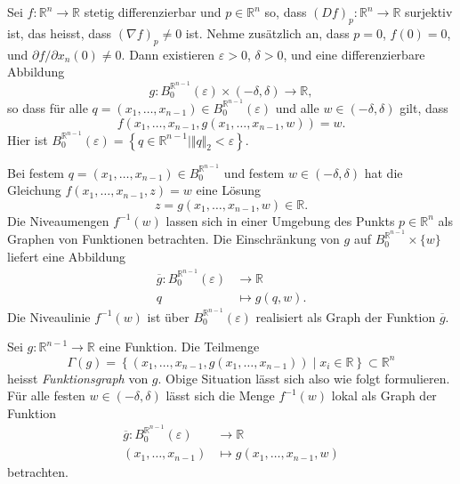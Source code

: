 \documentclass[../main.tex]{subfiles}
\begin{document}
\begin{theorem}%
  \label{thm:implicit-special}
  Sei $f \colon \mathbb{R}^n \to \mathbb{R}$ 
  stetig differenzierbar und $p \in \mathbb{R}^n$ 
  so, dass ${(Df)}_p \colon \mathbb{R}^n \to \mathbb{R}$ surjektiv ist,
  das heisst, dass ${(\nabla f)}_p \neq 0$ ist.
  Nehme zusätzlich an, dass $p = 0$, $f(0) = 0$,
  und $\partial f/ \partial x_n (0) \neq 0$.
  Dann existieren $\varepsilon > 0$, $\delta > 0$,
  und eine differenzierbare Abbildung
  \[
  g \colon B_0^{\mathbb{R}^{n-1}}(\varepsilon) \times (-\delta, \delta)
  \to \mathbb{R},
  \]
  so dass für alle 
  $q = (x_1, \dots, x_{n-1}) \in B_0^{\mathbb{R}^{n-1}}(\varepsilon)$ 
  und alle $w \in (-\delta, \delta)$ gilt, dass
  \[
  f(x_1, \dots, x_{n-1}, g(x_1, \dots, x_{n-1}, w)) = w.
  \]
  Hier ist $B_0^{\mathbb{R}^{n-1}}(\varepsilon)
  = \left\{q \in\mathbb{R}^{n-1} \mid \Vert q \Vert_2 < \varepsilon \right\}$.
\end{theorem}

\begin{geometric}
  Bei festem $q = (x_1, \dots, x_{n-1}) \in B_0^{\mathbb{R}^{n-1}}$ 
  und festem $w \in (-\delta, \delta)$ hat die Gleichung
  $f(x_1, \dots, x_{n-1}, z) = w$ eine Lösung
  \[
  z = g(x_1, \dots, x_{n-1}, w) \in \mathbb{R}.
  \]
  Die Niveaumengen $f^{-1}(w)$ lassen sich in einer
  Umgebung des Punkts $p \in \mathbb{R}^n$ 
  als Graphen von Funktionen betrachten.
  Die Einschränkung von $g$ auf $B_0^{\mathbb{R}^{n-1}} \times \{w\}$
  liefert eine Abbildung
  \begin{align*}
    \overline g \colon B_0^{\mathbb{R}^{n-1}}(\varepsilon) & \to \mathbb{R} \\
    q & \mapsto g(q, w).
  \end{align*}
  Die Niveaulinie $f^{-1}(w)$ ist über
  $B_0^{\mathbb{R}^{n-1}}(\varepsilon)$ realisiert als Graph der
  Funktion $\overline g$.
\end{geometric}

\begin{remark}
  Sei $g \colon \mathbb{R}^{n-1} \to \mathbb{R}$ eine Funktion.
  Die Teilmenge
  \[
    \Gamma(g) = \left\{(x_1, \dots, x_{n-1}, g(x_1, \dots, x_{n-1})) \mid 
    x_i \in \mathbb{R} \right\} \subset \mathbb{R}^n
  \]
  heisst \emph{Funktionsgraph} von $g$.
  Obige Situation lässt sich also wie folgt formulieren.
  Für alle festen $w \in (-\delta, \delta)$ lässt sich die
  Menge $f^{-1}(w)$ lokal als Graph der Funktion
  \begin{align*}
    \overline g \colon B_0^{\mathbb{R}^{n-1}}(\varepsilon) & \to \mathbb{R} \\
    (x_1, \dots, x_{n-1}) & \mapsto g(x_1, \dots, x_{n-1}, w)
  \end{align*}
  betrachten.
\end{remark}
\end{document}
